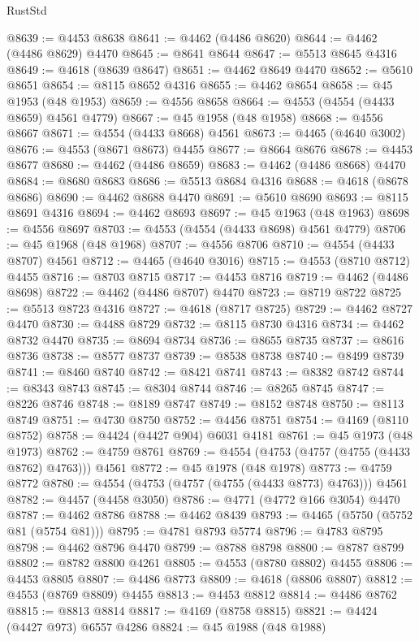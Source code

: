 \begin{lexlean}{RustStd}
\begin{coremodule}
@8639 := @4453 @8638
@8641 := @4462 (@4486 @8620)
@8644 := @4462 (@4486 @8629) @4470
@8645 := @8641 @8644
@8647 := @5513 @8645 @4316
@8649 := @4618 (@8639 @8647)
@8651 := @4462 @8649 @4470
@8652 := @5610 @8651
@8654 := @8115 @8652 @4316
@8655 := @4462 @8654
@8658 := @45 @1953 (@48 @1953)
@8659 := @4556 @8658
@8664 := @4553 (@4554 (@4433 @8659) @4561 @4779)
@8667 := @45 @1958 (@48 @1958)
@8668 := @4556 @8667
@8671 := @4554 (@4433 @8668) @4561
@8673 := @4465 (@4640 @3002)
@8676 := @4553 (@8671 @8673) @4455
@8677 := @8664 @8676
@8678 := @4453 @8677
@8680 := @4462 (@4486 @8659)
@8683 := @4462 (@4486 @8668) @4470
@8684 := @8680 @8683
@8686 := @5513 @8684 @4316
@8688 := @4618 (@8678 @8686)
@8690 := @4462 @8688 @4470
@8691 := @5610 @8690
@8693 := @8115 @8691 @4316
@8694 := @4462 @8693
@8697 := @45 @1963 (@48 @1963)
@8698 := @4556 @8697
@8703 := @4553 (@4554 (@4433 @8698) @4561 @4779)
@8706 := @45 @1968 (@48 @1968)
@8707 := @4556 @8706
@8710 := @4554 (@4433 @8707) @4561
@8712 := @4465 (@4640 @3016)
@8715 := @4553 (@8710 @8712) @4455
@8716 := @8703 @8715
@8717 := @4453 @8716
@8719 := @4462 (@4486 @8698)
@8722 := @4462 (@4486 @8707) @4470
@8723 := @8719 @8722
@8725 := @5513 @8723 @4316
@8727 := @4618 (@8717 @8725)
@8729 := @4462 @8727 @4470
@8730 := @4488 @8729
@8732 := @8115 @8730 @4316
@8734 := @4462 @8732 @4470
@8735 := @8694 @8734
@8736 := @8655 @8735
@8737 := @8616 @8736
@8738 := @8577 @8737
@8739 := @8538 @8738
@8740 := @8499 @8739
@8741 := @8460 @8740
@8742 := @8421 @8741
@8743 := @8382 @8742
@8744 := @8343 @8743
@8745 := @8304 @8744
@8746 := @8265 @8745
@8747 := @8226 @8746
@8748 := @8189 @8747
@8749 := @8152 @8748
@8750 := @8113 @8749
@8751 := @4730 @8750
@8752 := @4456 @8751
@8754 := @4169 (@8110 @8752)
@8758 := @4424 (@4427 @904) @6031 @4181
@8761 := @45 @1973 (@48 @1973)
@8762 := @4759 @8761
@8769 := @4554 (@4753 (@4757 (@4755 (@4433 @8762) @4763))) @4561
@8772 := @45 @1978 (@48 @1978)
@8773 := @4759 @8772
@8780 := @4554 (@4753 (@4757 (@4755 (@4433 @8773) @4763))) @4561
@8782 := @4457 (@4458 @3050)
@8786 := @4771 (@4772 @166 @3054) @4470
@8787 := @4462 @8786
@8788 := @4462 @8439
@8793 := @4465 (@5750 (@5752 @81 (@5754 @81)))
@8795 := @4781 @8793 @5774
@8796 := @4783 @8795
@8798 := @4462 @8796 @4470
@8799 := @8788 @8798
@8800 := @8787 @8799
@8802 := @8782 @8800 @4261
@8805 := @4553 (@8780 @8802) @4455
@8806 := @4453 @8805
@8807 := @4486 @8773
@8809 := @4618 (@8806 @8807)
@8812 := @4553 (@8769 @8809) @4455
@8813 := @4453 @8812
@8814 := @4486 @8762
@8815 := @8813 @8814
@8817 := @4169 (@8758 @8815)
@8821 := @4424 (@4427 @973) @6557 @4286
@8824 := @45 @1988 (@48 @1988)

\end{coremodule}
\end{lexlean}
